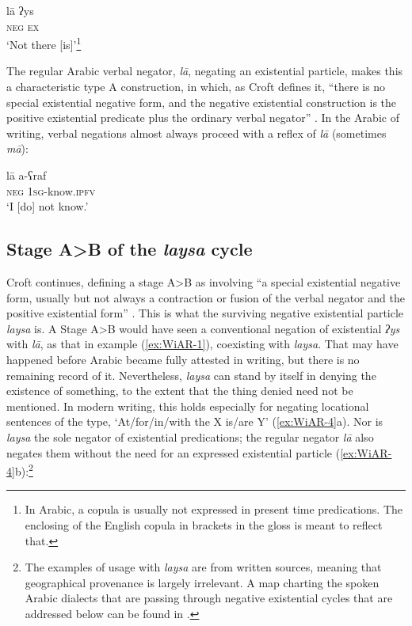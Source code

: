 \documentclass[output=paper,colorlinks,citecolor=brown]{langscibook}
\begin{document}
\ea \label{ex:WiAR-2}
	\gll lā ʔys\\
	\textsc{neg} \textsc{ex}\\
	\glt `Not there [is]’\footnote{In Arabic, a copula is usually not expressed in present time predications. The enclosing of the English copula in brackets in the gloss is meant to reflect that. } \citep[105]{al-far2003a}
\z

The regular Arabic verbal negator, \textit{lā}, negating an existential particle, makes this a characteristic type A construction, in which, as Croft defines it, “there is no special existential negative form, and the negative existential construction is the positive existential predicate plus the ordinary verbal negator” \citeyearpar[6--7]{Croft1991}. In the Arabic of writing, verbal negations almost always proceed with a reflex of \textit{lā} (sometimes \textit{mā}):

\ea \label{ex:WiAR-3}
	\gll lā a-ʕraf \\
	\textsc{neg} \textsc{1sg}-know.\textsc{ipfv} \\
	\glt ‘I [do] not know.’ \citep[144, 158]{adwan2000a}
\z

\subsection{Stage A>B of the \textit{laysa} cycle} \label{s:WiAR-2.1}

Croft continues, defining a stage A>B as involving “a special existential negative form, usually but not always a contraction or fusion of the verbal negator and the positive existential form” \citeyearpar[7]{Croft1991}. This is what the surviving negative existential particle \textit{laysa} is. A Stage A>B would have seen a conventional negation of existential \textit{ʔys} with \textit{lā}, as that in example (\ref{ex:WiAR-1}), coexisting with \textit{laysa}. That may have happened before Arabic became fully attested in writing, but there is no remaining record of it. Nevertheless, \textit{laysa} can stand by itself in denying the existence of something, to the extent that the thing denied need not be mentioned. In modern writing, this holds especially for negating locational sentences of the type, ‘At/for/in/with the X is/are Y’ (\ref{ex:WiAR-4}a). Nor is \textit{laysa} the sole negator of existential predications; the regular negator \textit{lā} also negates them without the need for an expressed existential particle (\ref{ex:WiAR-4}b):\footnote{The examples of usage with \textit{laysa} are from written sources, meaning that geographical provenance is largely irrelevant. A map charting the spoken Arabic dialects that are passing through negative existential cycles that are addressed below can be found in .}
\end{document}
